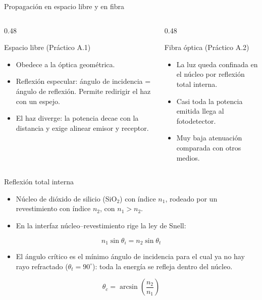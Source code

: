 \documentclass[aspectratio=169,10pt]{beamer}
\begin{document}
\begin{frame}{Propagación en espacio libre y en fibra}
  \begin{columns}[T]
    \begin{column}{0.48\textwidth}
      \begin{block}{Espacio libre (Práctico A.1)}
        \begin{itemize}
          \item Obedece a la óptica geométrica.
          \item {Reflexión especular}: ángulo de incidencia = ángulo de reflexión. Permite redirigir el haz con un espejo.
          \item El haz diverge: la potencia decae con la distancia y exige alinear emisor y receptor.
        \end{itemize}
      \end{block}
    \end{column}
    \begin{column}{0.48\textwidth}
      \begin{block}{Fibra óptica (Práctico A.2)}
        \begin{itemize}
          \item La luz queda confinada en el núcleo por {reflexión total interna}.
          \item Casi toda la potencia emitida llega al fotodetector.
          \item Muy baja atenuación comparada con otros medios.
        \end{itemize}
      \end{block}
    \end{column}
  \end{columns}
\end{frame}

\begin{frame}{Reflexión total interna}
  \begin{itemize}
    \item Núcleo de dióxido de silicio (SiO$_2$) con índice $n_1$, rodeado por un revestimiento con índice $n_2$, con $n_1 > n_2$.
    \item En la interfaz núcleo--revestimiento rige la {ley de Snell}:
  \end{itemize}
  \[
    n_1 \sin\theta_i = n_2 \sin\theta_t
  \]
  \begin{itemize}
    \item El {ángulo crítico} es el mínimo ángulo de incidencia para el cual ya no hay rayo refractado ($\theta_t = 90^\circ$): toda la energía se refleja dentro del núcleo.
  \end{itemize}
  \[
    \theta_c = \arcsin\!\left(\frac{n_2}{n_1}\right)
  \]
\end{frame}
\end{document}
